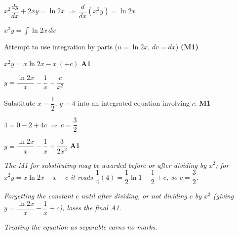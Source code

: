 \documentclass[12pt, twoside]{article}
\begin{document}
\begin{enumerate}[itemsep=0.3cm]
$x^{2}\dfrac{dy}{dx} + 2xy = \ln 2x
\ \Rightarrow\ \dfrac{d}{dx}\left(x^{2}y\right) = \ln 2x$

$x^{2}y = \displaystyle\int \ln 2x\, dx$

Attempt to use integration by parts
($u = \ln 2x$, $dv = dx$) \hfill \textbf{(M1)}

$x^{2}y = x\ln 2x - x \ (+c)$ \hfill \textbf{A1}

$y = \dfrac{\ln 2x}{x} - \dfrac{1}{x} + \dfrac{c}{x^{2}}$

Substitute $x = \dfrac{1}{2}$, $y = 4$ into an integrated equation involving
$c$: \hfill \textbf{M1}

$4 = 0 - 2 + 4c \ \Rightarrow\ c = \dfrac{3}{2}$

$y = \dfrac{\ln 2x}{x} - \dfrac{1}{x} + \dfrac{3}{2x^{2}}$ \hfill \textbf{A1}

\emph{The M1 for substituting may be awarded before or after dividing by
$x^{2}$; for $x^{2}y = x\ln 2x - x + c$ it reads
$\dfrac{1}{4}(4) = \dfrac{1}{2}\ln 1 - \dfrac{1}{2} + c$, so
$c = \dfrac{3}{2}$.}

\emph{Forgetting the constant $c$ until after dividing, or not dividing
$c$ by $x^{2}$ (giving $y = \dfrac{\ln 2x}{x} - \dfrac{1}{x} + c$), loses
the final A1.}

\emph{Treating the equation as separable earns no marks.}

\end{enumerate}
\end{document}
